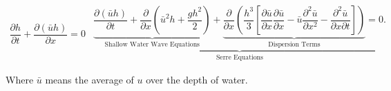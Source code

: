 \documentclass[SingleSpace,12pt]{Serre_ASCE}
\begin{document}
\begin{linenomath*}
\begin{subequations}\label{eq:Serre_conservative_form}
\begin{gather}
\dfrac{\partial h}{\partial t} + \dfrac{\partial (\bar{u}h)}{\partial x} = 0
\label{eq:Serre_continuity}
\end{gather}
\begin{gather}
\underbrace{\underbrace{\dfrac{\partial (\bar{u}h)}{\partial t} + \dfrac{\partial}{\partial x} \left ( \bar{u}^2h + \dfrac{gh^2}{2}\right )}_{\text{Shallow Water Wave Equations}} + \underbrace{\dfrac{\partial}{\partial x} \left (  \dfrac{h^3}{3} \left [ \dfrac{\partial \bar{u} }{\partial x} \dfrac{\partial \bar{u}}{\partial x} - \bar{u} \dfrac{\partial^2 \bar{u}}{\partial x^2}  - \dfrac{\partial^2 \bar{u}}{\partial x \partial t}\right ] \right )}_{\text{Dispersion Terms}} = 0.}_{\text{Serre Equations}}
\label{eq:Serre_momentum}
\end{gather}
\end{subequations}
\end{linenomath*}
Where $\bar{u}$ means the average of $u$ over the depth of water.

\end{document}
